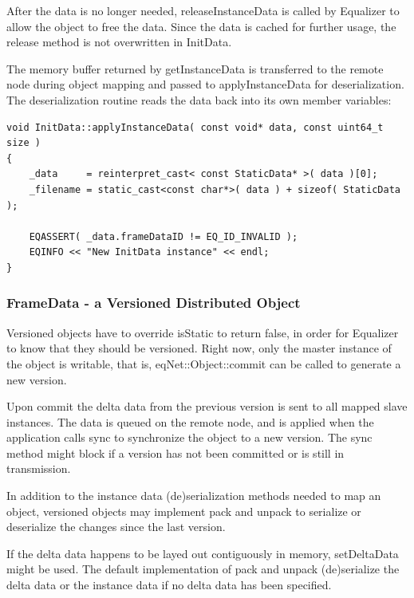\documentclass[10pt,a4]{scrartcl}
\begin{document}
After the data is no longer needed, \textsf{releaseInstanceData} is
called by Equalizer to allow the object to free the data. Since the data
is cached for further usage, the release method is not overwritten in
\textsf{InitData}.

The memory buffer returned by \textsf{getInstanceData} is transferred to
the remote node during object mapping and passed to
\textsf{applyInstanceData} for deserialization. The deserialization
routine reads the data back into its own member variables:

{\footnotesize\begin{lstlisting}
void InitData::applyInstanceData( const void* data, const uint64_t size )
{
    _data     = reinterpret_cast< const StaticData* >( data )[0];
    _filename = static_cast<const char*>( data ) + sizeof( StaticData );

    EQASSERT( _data.frameDataID != EQ_ID_INVALID );
    EQINFO << "New InitData instance" << endl;
}
\end{lstlisting}}%

\subsubsection{FrameData - a Versioned Distributed Object}

Versioned objects have to override \textsf{isStatic} to return false, in
order for Equalizer to know that they should be versioned. Right now,
only the master instance of the object is writable, that is,
\textsf{eqNet::Object::commit} can be called to generate a new
version. 

Upon \textsf{commit} the delta data from the previous version is sent to
all mapped slave instances. The data is queued on the remote node, and
is applied when the application calls \textsf{sync} to synchronize the
object to a new version. The \textsf{sync} method might block if a
version has not been committed or is still in transmission.

In addition to the instance data (de)serialization methods needed to map
an object, versioned objects may implement \textsf{pack} and
\textsf{unpack} to serialize or deserialize the changes since the last
version.

If the delta data happens to be layed out contiguously in memory,
\textsf{setDeltaData} might be used. The default implementation of
\textsf{pack} and \textsf{unpack} (de)serialize the delta data or the
instance data if no delta data has been specified.
\end{document}
